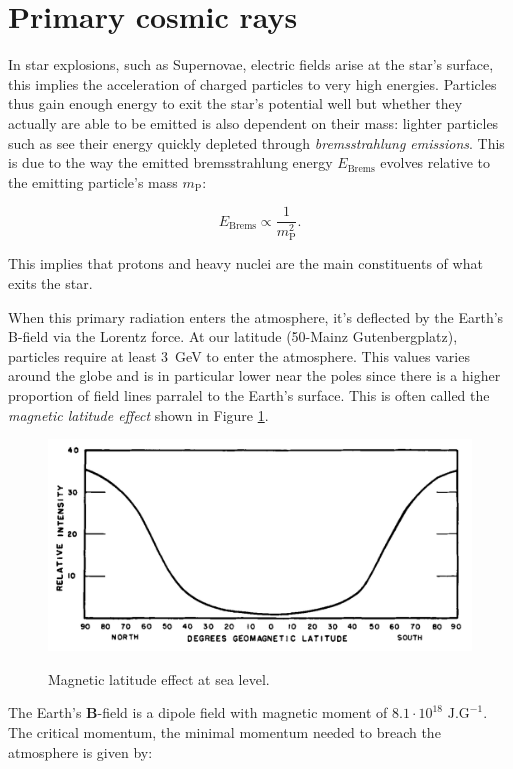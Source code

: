 \section{Primary cosmic rays}

In star explosions, such as Supernovae, electric fields arise at the star's surface, this implies the acceleration of charged particles to very high energies. Particles thus gain enough energy to exit the star's potential well but whether they actually are able to be emitted is also dependent on their mass: lighter particles such as \Pelectron see their energy quickly depleted through \textit{bremsstrahlung emissions}. This is due to the way the emitted bremsstrahlung energy $E_\text{Brems}$ evolves relative to the emitting particle's mass $m_\text{P}$:

\begin{equation}
E_\text{Brems}	\propto \frac{1}{m_\text{P}^2}.
\end{equation}

This implies that protons and heavy nuclei are the main constituents of what exits the star.

When this primary radiation enters the atmosphere, it's deflected by the Earth's B-field via the Lorentz force. At our latitude (50\degree -Mainz Gutenbergplatz), particles require at least \SI{3}{GeV} to enter the atmosphere. This values varies around the globe and is in particular lower near the poles since there is a higher proportion of field lines parralel to the Earth's surface. This is often called the \textit{magnetic latitude effect} shown in Figure \ref{fig:magintensity}.


\begin{figure}[htbp]
\centering
\includegraphics[width=0.8\linewidth]{./fig/intensity.png}
\label{fig:magintensity}
\caption{Magnetic latitude effect at sea level.}
\end{figure}

The Earth's $\mathbf{B}$-field is a dipole field with magnetic moment of $8.1 \cdot 10^{18}\text{ J}.\text{G}^{-1}$. The critical momentum, the minimal momentum needed to breach the atmosphere is given by:

